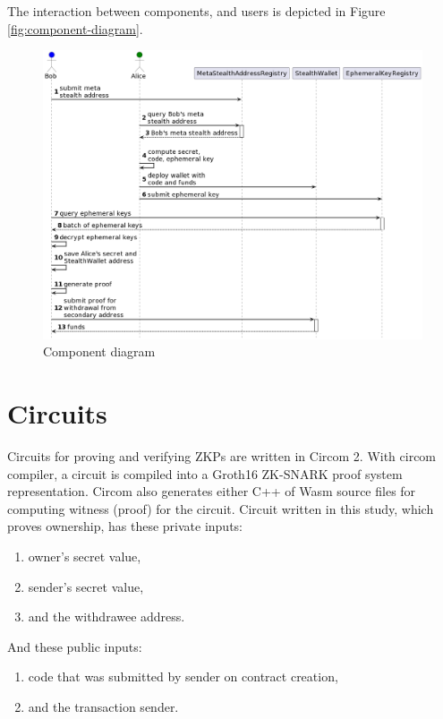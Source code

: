 The interaction between components, and users is depicted in Figure \ref{fig:component-diagram}.

\begin{figure}[h!]
    \centering
    \includegraphics[width=\textwidth]{assets/images/implementation-flow.png}
    \caption{Component diagram}
    \label{fig:implementation-diagram}
    \vspace{0.5cm}
\end{figure}


\section{Circuits}

Circuits for proving and verifying ZKPs are written in Circom 2\cite{circomCircomDocumentation}.
With circom compiler, a circuit is compiled into a Groth16
ZK-SNARK proof system\cite{Groth16} representation. Circom also generates
either C++ of Wasm source files for computing witness (proof) for the
circuit. Circuit written in this study, which proves ownership, has
these private inputs:
\begin{enumerate}
    \item owner's secret value,
    \item sender's secret value,
    \item and the withdrawee address.
\end{enumerate}
And these public inputs:
\begin{enumerate}
    \item code that was submitted by sender on contract creation,
    \item and the transaction sender.
\end{enumerate}

